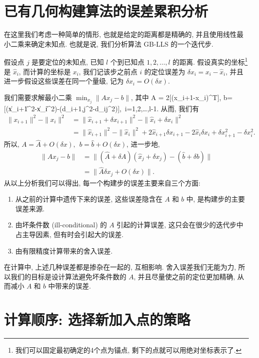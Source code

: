 \documentclass{CASthesis_zzk}
\begin{document}
\section{已有几何构建算法的误差累积分析}
\label{sec:ErrAnalysis}
在这里我们考虑一种简单的情形, 也就是给定的距离都是精确的,
并且使用线性最小二乘来确定未知点. 
也就是说, 我们分析算法 GB-LLS 的一个迭代步.

假设点 $j$ 是要定位的未知点, 已知 $l$ 个到已知点 $1,2,\ldots,l$ 的距离. 
假设真实的坐标\footnote{我们可以固定最初确定的4个点为锚点, 剩下的点就可以用绝对坐标表示了.}
是 $\widehat{x}_i$, 而计算的坐标是 $x_i$, 
我们记该步之前点 $i$ 的定位误差为 $\delta x_i=x_i-\widehat{x}_i$,
并且进一步假设这些误差在同一个量级, 记为 $\delta x_i=O(\delta x)$.

我们需要求解最小二乘 $\min_{x_j} \|Ax_j-b\|$, 其中
\be A = 2[(x_{i+1}-x_i)^T], b=[(\|x_{i+1}\|^2-\|x_i\|^2)-(d_{i+1,j}^2-d_{ij}^2)],~i=1,2,\ldots,l-1.\ee
从而, 我们有
\begin{align}
  \|x_{i+1}\|^2-\|x_i\|^2 & = \|\widehat{x}_{i+1}+\delta x_{i+1}\|^2-\|\widehat{x}_i+\delta x_i\|^2    \\
  & = \|\widehat{x}_{i+1}\|^2-\|\widehat{x}_i\|^2 + 2\widehat{x}_{i+1}\delta x_{i+1} - 2\widehat{x}_i\delta x_i + \delta x_{i+1}^2-\delta x_i^2.
\end{align}
所以, $A=\widehat{A}+O(\delta x),~~b=\widehat{b}+O(\delta x)$, 进一步地, 
\begin{align}
  \|Ax_j-b\| & =\|(\widehat{A}+\delta A)(\widehat{x}_j+\delta x_j)-(\widehat{b} + \delta b)\| \\
  & =\|\widehat{A} \delta x_j + O(\delta x)\|.
\end{align}
从以上分析我们可以得出, 每一个构建步的误差主要来自三个方面:
\begin{enumerate}
  \item 从之前的计算中遗传下来的误差, 这些误差隐含在 $A$ 和 $b$ 中, 是构建步的主要误差来源.
  \item 由坏条件数 (ill-conditional) 的 $A$ 引起的计算误差, 这只会在很少的迭代步中占主导因素, 但有时会引起大的误差.
  \item 由有限精度计算带来的舍入误差.
\end{enumerate}

在计算中, 上述几种误差都是掺杂在一起的, 互相影响.
舍入误差我们无能为力, 所以我们的目标是设计算法避免坏条件数的 $A$,
并且尽量使之前的定位更加精确, 从而减小 $A$ 和 $b$ 中带来的误差.


\section{计算顺序: 选择新加入点的策略}
\label{sec:CompOrder}
\end{document}
